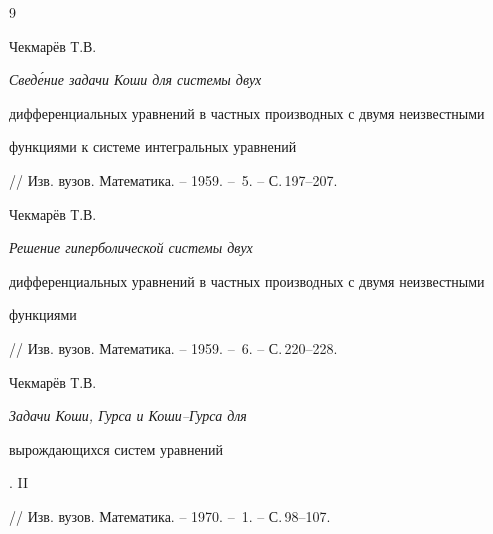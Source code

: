  


 


\begin{thebibliography}{9} 


 




Чекмар\"ев Т.В. {\em Свед\'ение задачи Коши для системы двух 


дифференциальных уравнений в частных производных с двумя неизвестными 


функциями к системе интегральных уравнений} 


// Изв. вузов. Математика. -- 1959. -- \No\,5. -- С.\,197--207. 




Чекмар\"ев Т.В. {\em Решение гиперболической системы двух 


дифференциальных уравнений в частных производных с двумя неизвестными 


функциями} 


// Изв. вузов. Математика. -- 1959. -- \No\,6. -- С.\,220--228. 




Чекмар\"ев Т.В. {\em Задачи Коши, Гурса и Коши--Гурса для 


вырождающихся систем уравнений}. II 


// Изв. вузов. Математика. -- 1970. -- \No\,1. -- С.\,98--107. 


 


 


\end{thebibliography} 


 


\vskip 2cm 


 






 


\label{end} 


 


